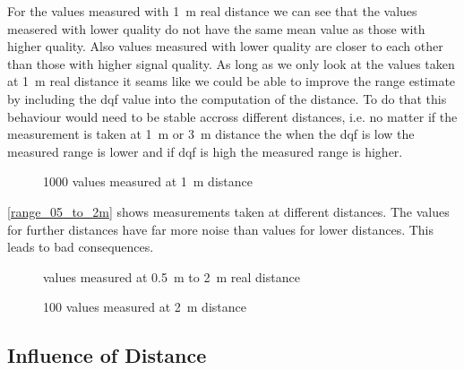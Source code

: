 For the values measured with \SI{1}{\metre} real distance we can see that the values measered with lower quality do not have the same mean value as those with higher quality.
Also values measured with lower quality are closer to each other than those with higher signal quality.
As long as we only look at the values taken at \SI{1}{\metre} real distance it seams like we could be able to improve the range estimate by including the dqf value into the computation of the distance.
To do that this behaviour would need to be stable accross different distances, i.e. no matter if the measurement is taken at \SI{1}{\metre} or \SI{3}{\metre} distance the when the dqf is low the measured range is lower and if dqf is high the measured range is higher.
\begin{figure}[H]
	\centering
	
	\caption{1000 values measured at \SI{1}{\metre} distance}
	\label{1m_scatterplot}
\end{figure}

\autoref{range_05_to_2m} shows measurements taken at different distances.
The values for further distances have far more noise than values for lower distances.
This leads to bad consequences.
\begin{figure}[H]
	\centering
	
	\caption{values measured at \SI{0.5}{\metre} to \SI{2}{\metre} real distance}
	\label{range_05_to_2m}
\end{figure}

\begin{figure}[H]
	\centering
	
	\caption{100 values measured at \SI{2}{\metre} distance}
	\label{2m}
\end{figure}

%

\subsection{Influence of Distance}

